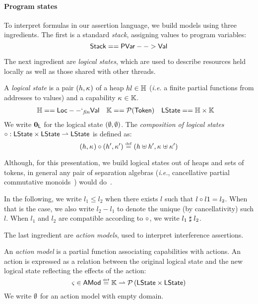 \paragraph{Program states}
To interpret formulas in our assertion language, we build models using
three ingredients. The first is a standard \emph{stack}, assigning
values to program variables:
\[
\mathsf{Stack} == \mathsf{PVar} --> \mathsf{Val}
\]

The next ingredient are \emph{logical states}, which are used to
describe resources held locally as well as those shared with other
threads. 

\begin{definition}
  A \emph{logical state} is a pair $(h, \kappa_{})$ of a heap $h
  l\in\mathbb{H}$ (\textit{i.e.} a finite partial functions from addresses
  to values) and a capability $\kappa_{} \in\mathbb{K}$.
  \begin{align*}
    \mathbb{H} &== \mathsf{Loc} --`_{\mathit{fin}} \mathsf{Val}&
    \mathbb{K} &== \mathcal{P}(\mathsf{Token})&
    \textsf{LState} &== \mathbb{H}\times \mathbb{K}
  \end{align*}
  We write $\mathbf{0}_{\textsf{L}}$ for the logical state $(\emptyset, \emptyset)$. The
  \emph{composition of logical states}
  $
  \circ : \textsf{LState} \times \textsf{LState} \rightharpoonup \textsf{LState}
  $
  is defined as:
  \[
  (h,\kappa_{}) \circ (h', \kappa_{}') \mathrel{\stackrel{\smash{\scriptscriptstyle{\mathrm{def}}}}{=}}
  (h\uplus h', \kappa_{}\uplus \kappa_{}')
  \]
\end{definition}

Although, for this presentation, we build logical states out of heaps
and sets of tokens, in general any pair of separation algebras
(\textit{i.e.}, cancellative partial commutative monoids~\cite{asl})
would do~\cite{colosl-tr14}.

In the following, we write $l_1\leq l_2$ when there exists $l$ such
that $l\circ l1 = l_2$. When that is the case, we also write $l_2
- l_1$ to denote the unique (by cancellativity) such $l$. When $l_1$
and $l_2$ are compatible according to $\circ$, we write
$l_1\mathrel{\sharp} l_2$.

The last ingredient are \emph{action models}, used to interpret
interference assertions.

\begin{definition}
An \emph{action model} is a partial function associating capabilities with actions. An action is expressed as a relation between the original logical state and the new logical state reflecting the effects of the action:
\[
	\varsigma_{} \in \textsf{AMod} \mathrel{\stackrel{\smash{\scriptscriptstyle{\mathrm{def}}}}{=}} \mathbb{K} \rightharpoonup \mathcal{P}\left(\textsf{LState} \times \textsf{LState} \right)
\]
We write $\emptyset$ for an action model with empty domain.
\end{definition}


